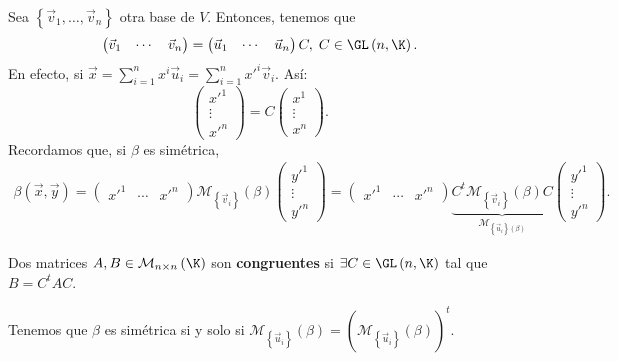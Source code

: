 Sea $\displaystyle \left\{ \vec{v}_{1}, \ldots, \vec{v}_{n}\right\}  $ otra base de $\displaystyle V $. Entonces, tenemos que 
	\[ \begin{pmatrix} \vec{v}_{1} & \cdots & \vec{v}_{n} \end{pmatrix} = \begin{pmatrix} \vec{u}_{1} & \cdots & \vec{u}_{n} \end{pmatrix}C, \; C \in \GL\left(n, \K\right) .\]
En efecto, si $\displaystyle \vec{x} = \sum^{n}_{i = 1}x^{i}\vec{u}_{i} = \sum^{n}_{i = 1}x'^{i}\vec{v}_{i} $. Así:
\[ \begin{pmatrix} x'^{1} \\ \vdots \\ x'^{n} \end{pmatrix} = C \begin{pmatrix} x^{1} \\ \vdots \\ x^{n} \end{pmatrix} .\]
Recordamos que, si $\displaystyle \beta  $ es simétrica, 
	\[
	\begin{split}
			\beta\left(\vec{x}, \vec{y}\right) =  \begin{pmatrix} x'^{1} & \cdots & x'^{n} \end{pmatrix} \mathcal{M}_{ \left\{ \vec{v}_{i}\right\} }\left(\beta \right)\begin{pmatrix} y'^{1} \\ \vdots \\ y'^{n} \end{pmatrix} 
				=   \begin{pmatrix} x'^{1} & \cdots & x'^{n} \end{pmatrix} \underbrace{C^{t}\mathcal{M}_{ \left\{ \vec{v}_{i}\right\} }\left(\beta \right) C}_{\mathcal{M}_{ \left\{ \vec{u}_{i}\right\} \left(\beta\right)}} \begin{pmatrix}y'^{1} \\ \vdots \\ y'^{n} \end{pmatrix} .
	\end{split}
	\]
\begin{fdefinition}[]
\normalfont Dos matrices $\displaystyle A,B \in \mathcal{M}_{n \times n}\left(\K\right) $ son \textbf{congruentes} si $\displaystyle \exists C \in \GL\left(n, \K\right) $ tal que $\displaystyle B = C^{t}AC $.
\end{fdefinition}
\begin{observation}
	\normalfont Tenemos que $\displaystyle \beta  $ es simétrica si y solo si $\displaystyle \mathcal{M}_{ \left\{ \vec{u}_{i}\right\} }\left(\beta \right) = \left( \mathcal{M}_{ \left\{ \vec{u}_{i}\right\} }\left(\beta \right)\right)^{t}   $.
\end{observation}
